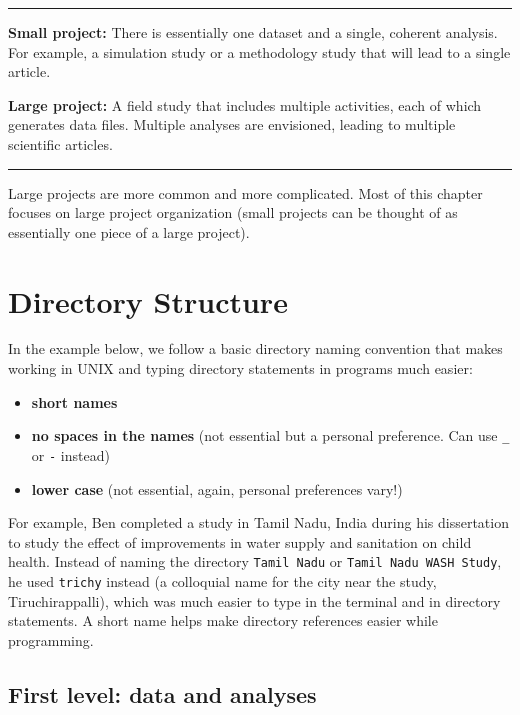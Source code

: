\documentclass[
]{book}
\providecommand{\tightlist}{%
  \setlength{\itemsep}{0pt}\setlength{\parskip}{0pt}}
\begin{document}
\begin{center}\rule{0.5\linewidth}{\linethickness}\end{center}

\textbf{Small project:} There is essentially one dataset and a single, coherent analysis. For example, a simulation study or a methodology study that will lead to a single article.

\textbf{Large project:} A field study that includes multiple activities, each of which generates data files. Multiple analyses are envisioned, leading to multiple scientific articles.

\begin{center}\rule{0.5\linewidth}{\linethickness}\end{center}

Large projects are more common and more complicated. Most of this chapter focuses on large project organization (small projects can be thought of as essentially one piece of a large project).

\hypertarget{directory-structure}{%
\section{Directory Structure}\label{directory-structure}}

In the example below, we follow a basic directory naming convention that makes working in UNIX and typing directory statements in programs much easier:

\begin{itemize}
\tightlist
\item
  \textbf{short names}
\item
  \textbf{no spaces in the names} (not essential but a personal preference. Can use \texttt{\_} or \texttt{-} instead)
\item
  \textbf{lower case} (not essential, again, personal preferences vary!)
\end{itemize}

For example, Ben completed a study in Tamil Nadu, India during his dissertation to study the effect of improvements in water supply and sanitation on child health. Instead of naming the directory \texttt{Tamil\ Nadu} or \texttt{Tamil\ Nadu\ WASH\ Study}, he used \texttt{trichy} instead (a colloquial name for the city near the study, Tiruchirappalli), which was much easier to type in the terminal and in directory statements. A short name helps make directory references easier while programming.

\hypertarget{first-level-data-and-analyses}{%
\subsection{First level: data and analyses}\label{first-level-data-and-analyses}}
\end{document}
